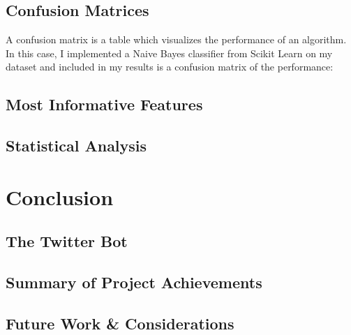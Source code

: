 \documentclass[11pt, twoside, reqno]{book}
\begin{document}
\section{Confusion Matrices}
\label{confusion_matrices}

A confusion matrix is a table which visualizes the performance of an algorithm. In this case, I implemented a Naive Bayes classifier from Scikit Learn on my dataset and included in my results is a confusion matrix of the performance:

\section{Most Informative Features}
\label{most_informative_features}

\section{Statistical Analysis}
\label{statistical_analysis}

\chapter{Conclusion}
\label{conclusion}

\section{The Twitter Bot}
\label{the_twitter_bot}

\section{Summary of Project Achievements}
\label{summary}

\section{Future Work \& Considerations}
\label{future_work_and_considerations}
\end{document}
